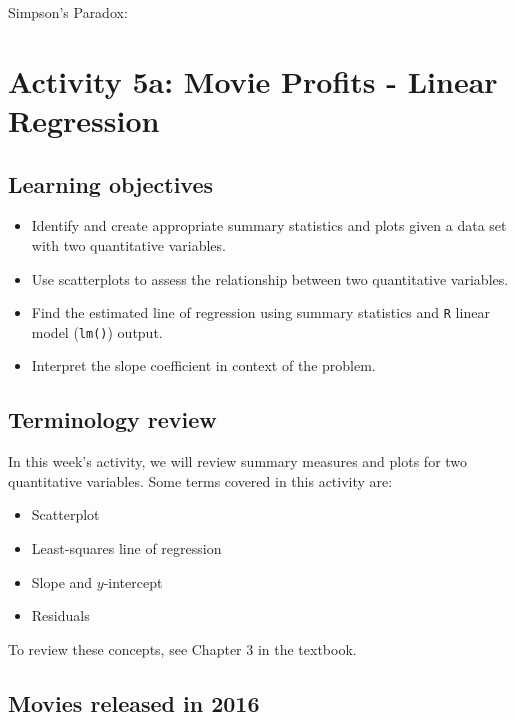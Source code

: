 \documentclass[
]{report}
\begin{document}
Simpson's Paradox:

\newpage

\hypertarget{activity-5a-movie-profits---linear-regression}{%
\section{Activity 5a: Movie Profits - Linear Regression}\label{activity-5a-movie-profits---linear-regression}}


\hypertarget{learning-objectives-3}{%
\subsection{Learning objectives}\label{learning-objectives-3}}

\begin{itemize}
\item
  Identify and create appropriate summary statistics and plots
  given a data set with two quantitative variables.
\item
  Use scatterplots to assess the relationship between two quantitative variables.
\item
  Find the estimated line of regression using summary statistics and \texttt{R} linear model (\texttt{lm()}) output.
\item
  Interpret the slope coefficient in context of the problem.
\end{itemize}

\hypertarget{terminology-review-9}{%
\subsection{Terminology review}\label{terminology-review-9}}

In this week's activity, we will review summary measures and plots for two quantitative variables. Some terms covered in this activity are:

\begin{itemize}
\item
  Scatterplot
\item
  Least-squares line of regression
\item
  Slope and \(y\)-intercept
\item
  Residuals
\end{itemize}

To review these concepts, see Chapter 3 in the textbook.

\hypertarget{movies-released-in-2016-2}{%
\subsection{Movies released in 2016}\label{movies-released-in-2016-2}}
\end{document}
